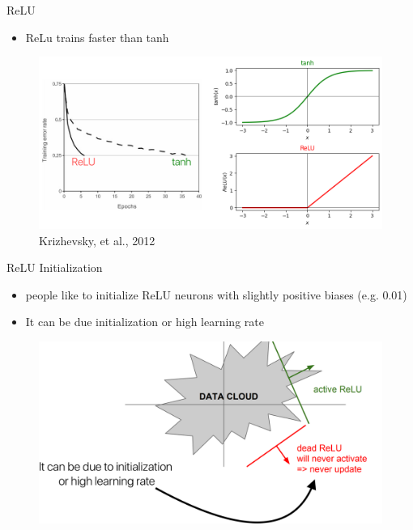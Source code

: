 \documentclass[serif, aspectratio=169]{beamer}
\begin{document}
\begin{frame}{ReLU}
	\begin{itemize}
		\item ReLu trains faster than tanh
	\end{itemize}
	\begin{figure}[htbp]
		\begin{center}
			\includegraphics[keepaspectratio, scale=0.3]{pic/relu_faster}
			\caption*{\scriptsize Krizhevsky, et al., 2012}
		\end{center}
	\end{figure}
\end{frame}

\begin{frame}{ReLU Initialization}
	\begin{itemize}
		\item people like to initialize ReLU neurons with slightly positive biases (e.g. 0.01)
		\item It can be due initialization or high learning rate
	\end{itemize}
	\begin{figure}[htpb]
		\begin{center}
			\includegraphics[keepaspectratio, scale=0.15]{pic/dead_relu}
		\end{center}
	\end{figure}
\end{frame}
\end{document}
